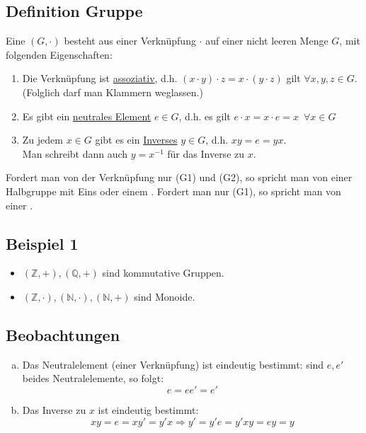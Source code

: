 \subsection{Definition Gruppe}
\label{sub:def_gruppe}
Eine  $(G,\cdot )$ besteht aus einer Verknüpfung $\cdot $ auf einer nicht leeren Menge $G$, mit folgenden Eigenschaften:
\begin{enumerate}[(G1)]
	\item Die Verknüpfung ist \uline{assoziativ}, d.h. $(x\cdot y)\cdot z = x \cdot (y \cdot z)$ gilt $\forall x,y,z \in G$.\\ 
	(Folglich darf man Klammern weglassen.)
	\item Es gibt ein \uline{neutrales Element} $e \in G$, d.h. es gilt $e\cdot x= x\cdot e= x \enspace \forall x\in G$
	\item Zu jedem $x\in G$ gibt es ein \uline{Inverses} $y \in G$, d.h. $xy=e=yx$.\\
	Man schreibt dann auch $y=x^{-1}$ für das Inverse zu $x$.
\end{enumerate}
Fordert man von der Verknüpfung nur (G1) und (G2), so spricht man von einer Halbgruppe mit Eins oder einem . 
Fordert man nur (G1), so spricht man von einer .

\subsection{Beispiel 1}
\label{sub:beispiel_1}
\begin{itemize}
	\item $(\mathds{Z}, +), (\mathds{Q}, +)$ sind kommutative Gruppen.
	\item $(\mathds{Z},\cdot), (\mathds{N},\cdot), (\mathds{N}, +)$ sind Monoide.
\end{itemize}

\subsection{Beobachtungen}
\label{sub:beobachtungen}
\begin{enumerate}[a)]
	\item Das Neutralelement (einer Verknüpfung) ist eindeutig bestimmt: sind $e,e'$ beides Neutralelemente, so folgt: 
	\[
	e=e e'=e'
	\]
	\item Das Inverse zu $x$ ist eindeutig bestimmt:
	\[
	xy=e=xy'=y'x \Rightarrow y'=y'e=y'xy=ey=y
	\]
\end{enumerate}

